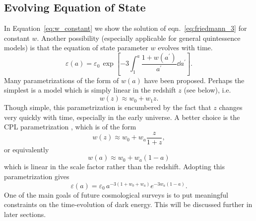 \subsection{Evolving Equation of State}
In Equation~\ref{eq:w_constant} we show the solution of
eqn.~\ref{eq:friedmann_3} for constant $w$.  Another possibility
(especially applicable for general quintessence models) is that
the equation of state parameter $w$ evolves with time.
\begin{equation}
  \label{eq:w_general}
  \varepsilon(a) = \varepsilon_0\, \exp\left[-3\int_1^a
    \frac{1 + w(a^\prime)}{a^\prime}\dd a^\prime\right].
\end{equation}
Many parametrizations of the form of $w(a)$ have been proposed.  Perhaps
the simplest is a model which is simply linear in the redshift $z$
(see below), i.e.
\begin{equation}
  w(z) \approx w_0 + w_1 z.
\end{equation}
Though simple, this parametrization is encumbered by the fact that $z$ changes
very quickly with time, especially in the early universe.  A better 
choice is the CPL parametrization \citep{Chevallier01, Linder03a}, which is
of the form
\begin{equation}
  w(z) \approx w_0 + w_a\frac{z}{1 + z},
\end{equation}
or equivalently
\begin{equation}
  w(a) \approx w_0 + w_a(1 - a)
\end{equation}
which is linear in the scale factor rather than the redshift.  Adopting this
parametrization gives
\begin{equation}
  \label{eq:w_first_order}
  \varepsilon(a) = \varepsilon_0\, a^{-3(1 + w_0 + w_a)}e^{-3w_a(1-a)}.
\end{equation}
One of the main goals of future cosmological surveys is to put meaningful
constraints on the time-evolution of dark energy.  This will be discussed
further in later sections.

